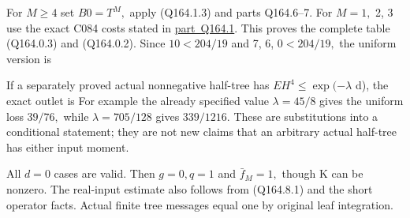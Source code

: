 For \(M\ge 4\) set \(B0=T^M,\allowbreak \) apply (Q164.1.3) and parts Q164.6--7.
For \(M=1,\allowbreak \) 2, 3 use the exact C084 costs stated in \mbox{\hyperref[part:Q164.1]{part Q164.1}}.
This proves the complete table (Q164.0.3) and (Q164.0.2).
Since \(10<204/19\) and 7, 6, \(0<204/19,\allowbreak \) the uniform version is

If a separately proved actual nonnegative half-tree has
\(EH^4\le \exp(-\lambda\) d), the exact outlet is
For example the already specified value \(\lambda=45/8\) gives the uniform
loss \(39/76,\allowbreak \) while \(\lambda=705/128\) gives \(339/1216.\)
These are substitutions into a conditional statement; they are not
new claims that an arbitrary actual half-tree has either input moment.

All \(d=0\) cases are valid. Then \(g=0,\allowbreak  q=1\) and \(\bar f_{M}=1,\allowbreak \) though K can be nonzero.
The real-input estimate also follows from (Q164.8.1) and the short
operator facts. Actual finite tree messages equal one by original leaf
integration. 
